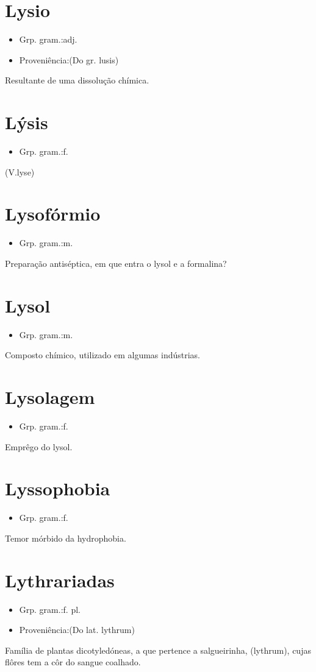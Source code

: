 \section{Lysio}
\begin{itemize}
\item {Grp. gram.:adj.}
\end{itemize}
\begin{itemize}
\item {Proveniência:(Do gr. \textunderscore lusis\textunderscore )}
\end{itemize}
Resultante de uma dissolução chímica.
\section{Lýsis}
\begin{itemize}
\item {Grp. gram.:f.}
\end{itemize}
(V.lyse)
\section{Lysofórmio}
\begin{itemize}
\item {Grp. gram.:m.}
\end{itemize}
Preparação antiséptica, em que entra o lysol e a formalina?
\section{Lysol}
\begin{itemize}
\item {Grp. gram.:m.}
\end{itemize}
Composto chímico, utilizado em algumas indústrias.
\section{Lysolagem}
\begin{itemize}
\item {Grp. gram.:f.}
\end{itemize}
Emprêgo do lysol.
\section{Lyssophobia}
\begin{itemize}
\item {Grp. gram.:f.}
\end{itemize}
Temor mórbido da hydrophobia.
\section{Lythrariadas}
\begin{itemize}
\item {Grp. gram.:f. pl.}
\end{itemize}
\begin{itemize}
\item {Proveniência:(Do lat. \textunderscore lythrum\textunderscore )}
\end{itemize}
Família de plantas dicotyledóneas, a que pertence a salgueirinha, (\textunderscore lythrum\textunderscore ), cujas flôres tem a côr do sangue coalhado.
